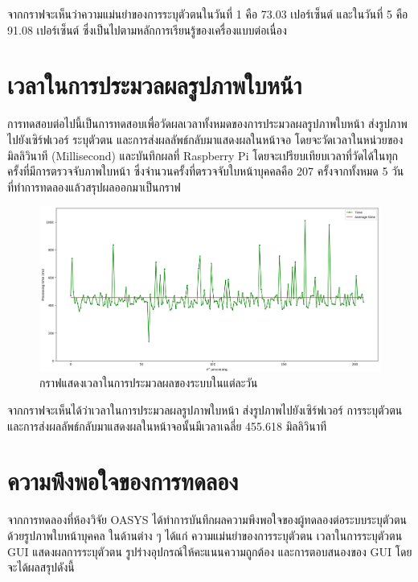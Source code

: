 \indent จากกราฟจะเห็นว่าความแม่นยำของการระบุตัวตนในวันที่ 1 คือ 73.03 เปอร์เซ็นต์ และในวันที่ 5 คือ 91.08 เปอร์เซ็นต์ ซึ่งเป็นไปตามหลักการเรียนรู้ของเครื่องแบบต่อเนื่อง


\section{เวลาในการประมวลผลรูปภาพใบหน้า}
การทดสอบต่อไปนี้เป็นการทดสอบเพื่อวัดผลเวลาทั้งหมดของการประมวลผลรูปภาพใบหน้า ส่งรูปภาพไปยังเซิร์ฟเวอร์ ระบุตัวตน และการส่งผลลัพธ์กลับมาแสดงผลในหน้าจอ
โดยจะวัดเวลาในหน่วยของมิลลิวินาที (Millisecond) และบันทึกผลที่ Raspberry Pi โดยจะเปรียบเทียบเวลาที่วัดได้ในทุกครั้งที่มีการตรวจจับภาพใบหน้า 
ซึ่งจำนวนครั้งที่ตรวจจับใบหน้าบุคคลคือ 207 ครั้งจากทั้งหมด 5 วันที่ทำการทดลองแล้วสรุปผลออกมาเป็นกราฟ
  
\begin{figure}[!ht]
  \begin{center}
    \includegraphics[scale=.4]{pic/Time.png}
    \caption[กราฟแสดงเวลาในการประมวลผลของระบบในแต่ละวัน]{กราฟแสดงเวลาในการประมวลผลของระบบในแต่ละวัน}
    \label{fig:time_graph}
  \end{center}
\end{figure}
\newpage
\indent จากกราฟจะเห็นได้ว่าเวลาในการประมวลผลรูปภาพใบหน้า ส่งรูปภาพไปยังเซิร์ฟเวอร์ การระบุตัวตน และการส่งผลลัพธ์กลับมาแสดงผลในหน้าจอนั้นมีเวลาเฉลี่ย 455.618 มิลลิวินาที



\section{ความพึงพอใจของการทดลอง}
จากการทดลองที่ห้องวิจัย OASYS ได้ทำการบันทึกผลความพึงพอใจของผู้ทดลองต่อระบบระบุตัวตนด้วยรูปภาพใบหน้าบุคคล ในด้านต่าง ๆ ได้แก่ 
ความแม่นยำของการระบุตัวตน เวลาในการระบุตัวตน GUI แสดงผลการระบุตัวตน รูปร่างอุปกรณ์ให้คะแนนความถูกต้อง และการตอบสนองของ GUI โดยจะได้ผลสรุปดังนี้

